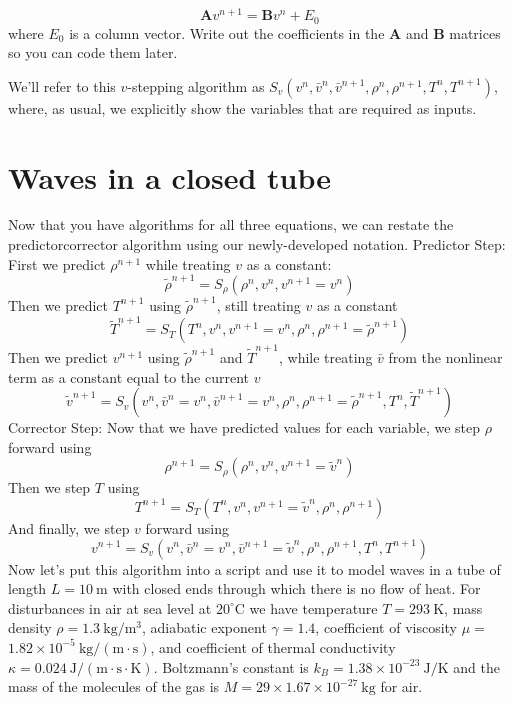 \documentclass{book}
\theoremstyle{plain}
\theoremstyle{definition}
\numberwithin{exm}{chapter}
\theoremstyle{remark}
\theoremstyle{summary}
\theoremstyle{overview}
\begin{document}
\begin{equation*}
\mathbf{A} v^{n+1}=\mathbf{B} v^{n}+E_{0}
\end{equation*}
where $E_{0}$ is a column vector. Write out the coefficients in the $\mathbf{A}$ and $\mathbf{B}$ matrices so you can code them later.

We\rq ll refer to this $v$-stepping algorithm as $S_{v}\left(v^{n}, \bar{v}^{n}, \bar{v}^{n+1}, \rho^{n}, \rho^{n+1}, T^{n}, T^{n+1}\right)$, where, as usual, we explicitly show the variables that are required as inputs.
\section*{Waves in a closed tube}

Now that you have algorithms for all three equations, we can restate the predictorcorrector algorithm using our newly-developed notation.
Predictor Step: First we predict $\rho^{n+1}$ while treating $v$ as a constant:
$$
\tilde{\rho}^{n+1}=S_{\rho}\left(\rho^{n}, v^{n}, v^{n+1}=v^{n}\right)
$$
Then we predict $T^{n+1}$ using $\tilde{\rho}^{n+1}$, still treating $v$ as a constant
$$
\tilde{T}^{n+1}=S_{T}\left(T^{n}, v^{n}, v^{n+1}=v^{n}, \rho^{n}, \rho^{n+1}=\tilde{\rho}^{n+1}\right)
$$
Then we predict $v^{n+1}$ using $\tilde{\rho}^{n+1}$ and $\tilde{T}^{n+1}$, while treating $\bar{v}$ from the nonlinear term as a constant equal to the current $v$
$$
\tilde{v}^{n+1}=S_{v}\left(v^{n}, \bar{v}^{n}=v^{n}, \bar{v}^{n+1}=v^{n}, \rho^{n}, \rho^{n+1}=\tilde{\rho}^{n+1}, T^{n}, \tilde{T}^{n+1}\right)
$$
Corrector Step: Now that we have predicted values for each variable, we step $\rho$ forward using
$$
\rho^{n+1}=S_{\rho}\left(\rho^{n}, v^{n}, v^{n+1}=\tilde{v}^{n}\right)
$$
Then we step $T$ using
$$
T^{n+1}=S_{T}\left(T^{n}, v^{n}, v^{n+1}=\tilde{v}^{n}, \rho^{n}, \rho^{n+1}\right)
$$
And finally, we step $v$ forward using
$$
v^{n+1}=S_{v}\left(v^{n}, \bar{v}^{n}=v^{n}, \bar{v}^{n+1}=\tilde{v}^{n}, \rho^{n}, \rho^{n+1}, T^{n}, T^{n+1}\right)
$$
Now let\rq s put this algorithm into a script and use it to model waves in a tube of length $L=10 \mathrm{~m}$ with closed ends through which there is no flow of heat. For disturbances in air at sea level at $20^{\circ} \mathrm{C}$ we have temperature $T=293 \mathrm{~K}$, mass density $\rho=1.3 \mathrm{~kg} / \mathrm{m}^{3}$, adiabatic exponent $\gamma=1.4$, coefficient of viscosity $\mu=$ $1.82 \times 10^{-5} \mathrm{~kg} /(\mathrm{m} \cdot \mathrm{s})$, and coefficient of thermal conductivity $\kappa=0.024 \mathrm{~J} /(\mathrm{m} \cdot \mathrm{s} \cdot \mathrm{K})$. Boltzmann\rq s constant is $k_{B}=1.38 \times 10^{-23} \mathrm{~J} / \mathrm{K}$ and the mass of the molecules of the gas is $M=29 \times 1.67 \times 10^{-27} \mathrm{~kg}$ for air.
\end{document}
